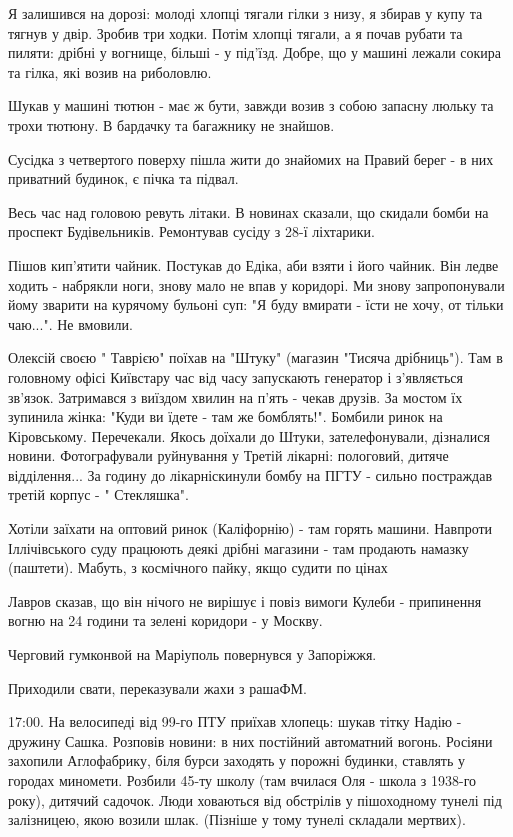 Я залишився на дорозі:  молоді хлопці тягали гілки з низу, я збирав у купу та
тягнув у двір. Зробив три ходки. Потім хлопці тягали, а я почав рубати та
пиляти: дрібні у вогнище, більші - у під'їзд. Добре, що у машині лежали сокира
та гілка, які возив на риболовлю. 

Шукав у машині тютюн - має ж бути, завжди возив з собою запасну люльку та трохи
тютюну. В бардачку та багажнику не знайшов. 

Сусідка з четвертого поверху пішла жити до знайомих на Правий берег - в них
приватний будинок, є пічка та підвал.

Весь час над головою ревуть літаки. В новинах сказали, що скидали бомби на
проспект Будівельників. Ремонтував сусіду з 28-ї ліхтарики.

Пішов кип'ятити чайник. Постукав до Едіка, аби взяти і його чайник. Він ледве
ходить - набрякли ноги, знову мало не впав у коридорі. Ми знову запропонували
йому зварити на курячому бульоні суп: "Я буду вмирати - їсти не хочу, от тільки
чаю...". Не вмовили.

Олексій своєю " Таврією"  поїхав на "Штуку" (магазин "Тисяча дрібниць"). Там в
головному офісі Київстару час від часу запускають генератор і з'являється
зв'язок. Затримався з виїздом хвилин на п'ять - чекав друзів. За мостом їх
зупинила жінка: "Куди ви їдете - там же бомблять!". Бомбили ринок на
Кіровському. Перечекали. Якось доїхали до Штуки, зателефонували, дізналися
новини. Фотографували руйнування у Третій лікарні: пологовий, дитяче
відділення... За годину до лікарніскинули бомбу на ПГТУ - сильно постраждав
третій корпус - " Стекляшка".

Хотіли заїхати на оптовий ринок (Каліфорнію) - там горять машини. Навпроти
Іллічівського суду працюють деякі дрібні магазини - там продають намазку
(паштети). Мабуть, з космічного пайку, якщо судити по цінах 

Лавров сказав, що він нічого не вирішує і повіз вимоги Кулеби - припинення
вогню на 24 години та зелені коридори -  у Москву.

Черговий гумконвой на Маріуполь повернувся у Запоріжжя.

Приходили свати, переказували жахи з рашаФМ.

17:00. На велосипеді від 99-го ПТУ приїхав хлопець: шукав тітку Надію - дружину
Сашка. Розповів новини: в них постійний автоматний вогонь. Росіяни захопили
Аглофабрику, біля бурси заходять у порожні будинки, ставлять у городах
миномети. Розбили 45-ту школу (там вчилася Оля - школа з 1938-го року), дитячий
садочок. Люди ховаються від обстрілів у пішоходному тунелі під залізницею, якою
возили шлак. (Пізніше у тому тунелі складали мертвих).

